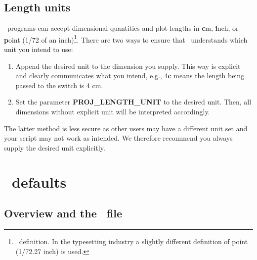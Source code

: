 \subsection{Length units}

\GMT\ programs can accept dimensional quantities and plot lengths
in \textbf{c}m, \textbf{i}nch,
or \textbf{p}oint (1/72 of an inch)\footnote{\PS\ definition.
In the typesetting industry a slightly different definition of point
(1/72.27 inch) is used.}.  There are two ways to ensure that \GMT\ understands
which unit you intend to use:

\begin{enumerate}
\item Append the desired unit to the dimension you supply.  This
way is explicit and clearly communicates what you intend, e.g.,
4\textbf{c} means the length being passed to the  switch is 4 cm.

\item Set the parameter \textbf{PROJ\_LENGTH\_UNIT} to the desired unit.  Then, all
dimensions without explicit unit will be interpreted accordingly.

\end{enumerate}
The latter method is less secure as other users may have a different unit
set and your script may not work as intended.  We therefore recommend
you always supply the desired unit explicitly.

\section{\gmt\ defaults}
\label{sec:gmt.conf}
\subsection{Overview and the \protect{}\ file}



